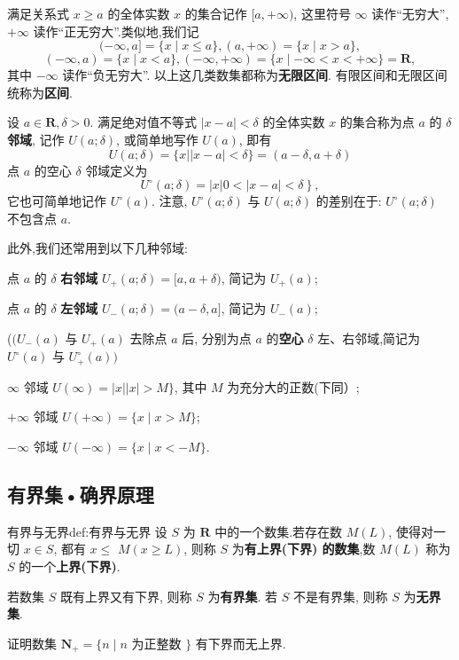 满足关系式 $x \geqslant a$ 的全体实数 $x$ 的集合记作 $[a,+\infty)$, 这里符号 $\infty$ 读作“无穷大”, $+\infty$ 读作“正无穷大”.类似地,我们记
\[
(-\infty, a]=\{x \mid x \leqslant a\},(a,+\infty)=\{x \mid x>a\},
\]
\[
(-\infty, a)=\{x \mid x<a\},(-\infty,+\infty)=\{x \mid-\infty<x<+\infty\}=\mathbf{R},
\]
其中 $-\infty$ 读作“负无穷大”. 以上这几类数集都称为\textbf{无限区间}. 有限区间和无限区间统称为\textbf{区间}.

设 $a \in \mathbf{R}, \delta>0 .$ 满足绝对值不等式 $|x-a|<\delta$ 的全体实数 $x$ 的集合称为点 $a$ 的 $\delta$ \textbf{邻域}, 记作 $U(a ; \delta)$, 或简单地写作 $U(a)$, 即有
\[
U(a ; \delta)=\{x|| x-a \mid<\delta\}=(a-\delta, a+\delta)
\]
点 $a$ 的空心 $\delta$ 邻域定义为
\[
\left.U^{\circ}(a ; \delta)=|x| 0<|x-a|<\delta\right\},
\]
它也可简单地记作 $U^{\circ}(a)$. 注意, $U^{\circ}(a ; \delta)$ 与 $U(a ; \delta)$ 的差别在于: $U^{\circ}(a ; \delta)$ 不包含点 $a .$

此外,我们还常用到以下几种邻域:

点 $a$ 的 $\delta$ \textbf{右邻域} $U_{+}(a ; \delta)=[a, a+\delta)$, 简记为 $U_{+}(a)$;

点 $a$ 的 $\delta$ \textbf{左邻域} $U_{-}(a ; \delta)=(a-\delta, a]$, 简记为 $U_{-}(a)$;

($(U_{-}(a)$ 与 $U_{+}(a)$ 去除点 $a$ 后, 分别为点 $a$ 的\textbf{空心} $\delta$ 左、右邻域,简记为 $U^{\circ}(a)$ 与 $U_{+}^{\circ}(a) )$

$\infty$ 邻域 $U(\infty)=|x||x|>M\}$, 其中 $M$ 为充分大的正数(下同）;

$+\infty$ 邻域 $U(+\infty)=\{x \mid x>M\}$;

$-\infty$ 邻域 $U(-\infty)=\{x \mid x<-M\}$.

\subsection{有界集•确界原理}

\begin{definition}{有界与无界}{def:有界与无界}
	设 $S$ 为 $\mathbf{R}$ 中的一个数集.若存在数 $M(L)$, 使得对一切 $x \in S$, 都有 $x \leqslant$ $M(x \geqslant L)$, 则称 $S$ 为\textbf{有上界(下界) 的数集},数 $M(L)$ 称为 $S$ 的一个\textbf{上界(下界)}.

	若数集 $S$ 既有上界又有下界, 则称 $S$ 为\textbf{有界集}. 若 $S$ 不是有界集, 则称 $S$ 为\textbf{无界集}.
\end{definition}

\begin{example}
	证明数集 $\mathbf{N}_{+}=\{n \mid n$ 为正整数 $\}$ 有下界而无上界.
\end{example}

